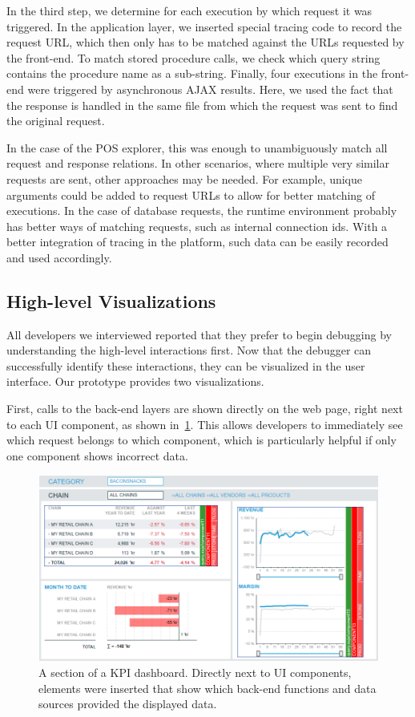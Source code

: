 \documentclass[
      english,
			conference,
      ]{IEEEtran}
\begin{document}
In the third step, we determine for each execution by which request it was triggered.
In the application layer, we inserted special tracing code to record the request URL, which then only has to be matched against the URLs requested by the front-end.
To match stored procedure calls, we check which query string contains the procedure name as a sub-string.
Finally, four executions in the front-end were triggered by asynchronous AJAX results.
Here, we used the fact that the response is handled in the same file from which the request was sent to find the original request.

In the case of the POS explorer, this was enough to unambiguously match all request and response relations.
In other scenarios, where multiple very similar requests are sent, other approaches may be needed.
For example, unique arguments could be added to request URLs to allow for better matching of executions.
In the case of database requests, the runtime environment probably has better ways of matching requests, such as internal connection ids.
With a better integration of tracing in the platform, such data can be easily recorded and used accordingly.

\subsection{High-level Visualizations}


All developers we interviewed reported that they prefer to begin debugging by understanding the high-level interactions first.
Now that the debugger can successfully identify these interactions, they can be visualized in the user interface.
Our prototype provides two visualizations.

First, calls to the back-end layers are shown directly on the web page, right next to each UI component, as shown in~\cref{fig:pos}.
This allows developers to immediately see which request belongs to which component, which is particularly helpful if only one component shows incorrect data.

\begin{figure}
	\centering
		\includegraphics[width=1.00\linewidth]{pos.png}
	\caption{A section of a KPI dashboard. Directly next to UI components, elements were inserted that show which back-end functions and data sources provided the displayed data.}
	\label{fig:pos}
\end{figure}
\end{document}
